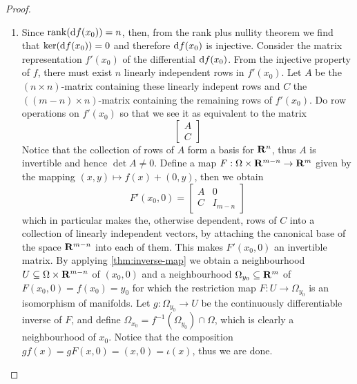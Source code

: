 \begin{proof}
  \begin{enumerate}\setlength\itemsep{0em}
    \item Since \(\operatorname{rank}(\mathrm{d} f(x_0)) = n\), then, from the rank plus nullity
      theorem we find that \(\ker (\mathrm{d} f(x_0)) = 0\) and therefore \(\mathrm{d}
      f(x_{0})\) is injective. Consider the matrix representation \(f'(x_0)\)
      of the differential \(\mathrm{d} f(x_0)\). From the injective property of
      \(f\), there must exist \(n\) linearly independent rows in
      \(f'(x_0)\). Let \(A\) be the \((n \times n)\)-matrix containing these linearly
      indepent rows and \(C\) the \(((m - n) \times n)\)-matrix containing the
      remaining rows of \(f'(x_0)\). Do row operations on \(f'(x_0)\) so that we
      see it as equivalent to the matrix
      \[
        \begin{bmatrix}
          A \\ C
        \end{bmatrix}
      \]
      Notice that the collection of rows of \(A\) form a basis for \(\mathbf{R}^n\),
      thus \(A\) is invertible and hence \(\det A \neq 0\). Define a map \(F: \Omega \times
      \mathbf{R}^{m-n} \to \mathbf{R}^m\) given by the mapping \((x, y) \mapsto f(x) + (0, y)\), then we
      obtain
      \[
        F'(x_0, 0) =
        \begin{bmatrix}
          A &0 \\ C &I_{m - n}
        \end{bmatrix}
      \]
      which in particular makes the, otherwise dependent, rows of \(C\) into a
      collection of linearly independent vectors, by attaching the canonical
      base of the space \(\mathbf{R}^{m-n}\) into each of them. This makes \(F'(x_0,
      0)\) an invertible matrix. By applying \cref{thm:inverse-map} we obtain a
      neighbourhood \(U \subseteq \Omega \times \mathbf{R}^{m-n}\) of \((x_0, 0)\) and a neighbourhood
      \(\Omega_{y_0} \subseteq \mathbf{R}^m\) of \(F(x_0, 0) = f(x_{0}) = y_0\) for which the
      restriction map \(F: U \to \Omega_{y_0}\) is an isomorphism of manifolds. Let \(g:
      \Omega_{y_0} \to U\) be the continuously differentiable inverse of \(F\), and
      define \(\Omega_{x_0} = f^{-1}(\Omega_{y_0}) \cap \Omega\), which is clearly a neighbourhood
      of \(x_0\). Notice that the composition \(g f(x) = g F (x, 0) = (x, 0) =
      \iota(x)\), thus we are done.


\end{enumerate}
\end{proof}
